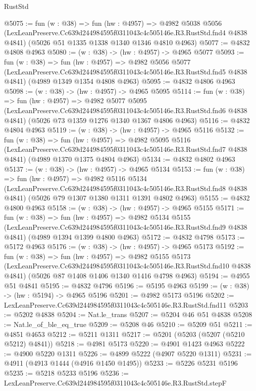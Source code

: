 \begin{lexlean}{RustStd}
\begin{coremodule}
@5075 := fun (w : @38) =>
  fun (hw : @4957) =>
  @4982
    @5038
    @5056
    (LexLeanPreserve.Cc639d244984595f0311043c4c505146e.R3.RustStd.fnd4 @4838 @4841)
    (@5026 @51 @1335 @1338 @1340 @1346 @4810 @4963)
@5077 := @4832 @4808 @4963
@5080 := (w : @38) -> (hw : @4957) -> @4965 @5077
@5093 := fun (w : @38) =>
  fun (hw : @4957) =>
  @4982
    @5056
    @5077
    (LexLeanPreserve.Cc639d244984595f0311043c4c505146e.R3.RustStd.fnd5 @4838 @4841)
    (@4989 @1349 @1354 @4808 @4963)
@5095 := @4832 @4806 @4963
@5098 := (w : @38) -> (hw : @4957) -> @4965 @5095
@5114 := fun (w : @38) =>
  fun (hw : @4957) =>
  @4982
    @5077
    @5095
    (LexLeanPreserve.Cc639d244984595f0311043c4c505146e.R3.RustStd.fnd6 @4838 @4841)
    (@5026 @73 @1359 @1276 @1340 @1367 @4806 @4963)
@5116 := @4832 @4804 @4963
@5119 := (w : @38) -> (hw : @4957) -> @4965 @5116
@5132 := fun (w : @38) =>
  fun (hw : @4957) =>
  @4982
    @5095
    @5116
    (LexLeanPreserve.Cc639d244984595f0311043c4c505146e.R3.RustStd.fnd7 @4838 @4841)
    (@4989 @1370 @1375 @4804 @4963)
@5134 := @4832 @4802 @4963
@5137 := (w : @38) -> (hw : @4957) -> @4965 @5134
@5153 := fun (w : @38) =>
  fun (hw : @4957) =>
  @4982
    @5116
    @5134
    (LexLeanPreserve.Cc639d244984595f0311043c4c505146e.R3.RustStd.fnd8 @4838 @4841)
    (@5026 @79 @1307 @1380 @1311 @1391 @4802 @4963)
@5155 := @4832 @4800 @4963
@5158 := (w : @38) -> (hw : @4957) -> @4965 @5155
@5171 := fun (w : @38) =>
  fun (hw : @4957) =>
  @4982
    @5134
    @5155
    (LexLeanPreserve.Cc639d244984595f0311043c4c505146e.R3.RustStd.fnd9 @4838 @4841)
    (@4989 @1394 @1399 @4800 @4963)
@5172 := @4832 @4798
@5173 := @5172 @4963
@5176 := (w : @38) -> (hw : @4957) -> @4965 @5173
@5192 := fun (w : @38) =>
  fun (hw : @4957) =>
  @4982
    @5155
    @5173
    (LexLeanPreserve.Cc639d244984595f0311043c4c505146e.R3.RustStd.fnd10 @4838 @4841)
    (@5026 @87 @1408 @1406 @1340 @1416 @4798 @4963)
@5194 := @4955 @51 @4841
@5195 := @4832 @4796
@5196 := @5195 @4963
@5199 := (w : @38) -> (hw : @5194) -> @4965 @5196
@5201 := @4982 @5173 @5196
@5202 := LexLeanPreserve.Cc639d244984595f0311043c4c505146e.R3.RustStd.fnd11
@5203 := @5202 @4838
@5204 := Nat.le_trans
@5207 := @5204 @46 @51 @4838
@5208 := Nat.le_of_ble_eq_true
@5209 := @5208 @46
@5210 := @5209 @51
@5211 := @4851 @4653
@5212 := @5211 @1311
@5217 := @5201 (@5203 (@5207 (@5210 @5212) @4841))
@5218 := @4981 @5173
@5220 := @4901 @1423 @4963
@5222 := @4900 @5220 @1311
@5226 := @4899 @5222 (@4907 @5220 @1311)
@5231 := @4911 (@4913 @1444 (@4916 @1450 @1495))
@5233 := @5226 @5231 @5196
@5235 := @5218 @5233 @5196
@5236 := LexLeanPreserve.Cc639d244984595f0311043c4c505146e.R3.RustStd.stepF

\end{coremodule}
\end{lexlean}
